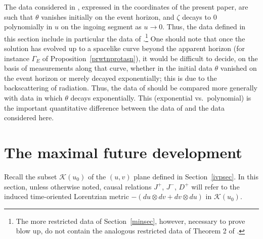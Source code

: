 \documentclass{article}
\begin{document}
The data considered in \cite{md:si}, 
expressed in the coordinates of the present paper,
are such that $\theta$ vanishes initially on the event horizon, 
and $\zeta$ decays to $0$
polynomially in $u$ on the ingoing segment as $u\to0$. 
Thus, the data defined in this section include
in particular the data of \cite{md:si}.\footnote{The more restricted
data of Section~\ref{minsec}, however, necessary to prove blow up,
do not contain the analogous restricted
data of Theorem 2 of \cite{md:si}.}
One should note that once the solution has evolved up to a spacelike
curve beyond the apparent horizon 
(for instance $\Gamma_{E}$
of Proposition~\ref{prwtnprotasn}), it would be difficult to decide,
on the basis of measurements
along that curve, whether in the initial data $\theta$ vanished
on the event horizon or merely decayed exponentially; this
is due to
the backscattering of radiation.
Thus, the data of \cite{md:si}
should be compared more generally
with data in which $\theta$ decays exponentially. 
This (exponential vs.~polynomial) is the important quantitative
difference 
between the data of \cite{md:si} and the data considered here.




\section{The maximal future development}
\label{mddsec}
Recall the subset 
$\mathcal{K}(u_0)$ of the $(u,v)$ plane defined in Section~\ref{ivpsec}.
In this section, unless otherwise noted, causal relations $J^+$, $J^-$, $D^+$ 
will refer
to the induced time-oriented Lorentzian metric $-(du\otimes dv+dv\otimes du)$ 
in $\mathcal{K}(u_0)$. 
\end{document}
